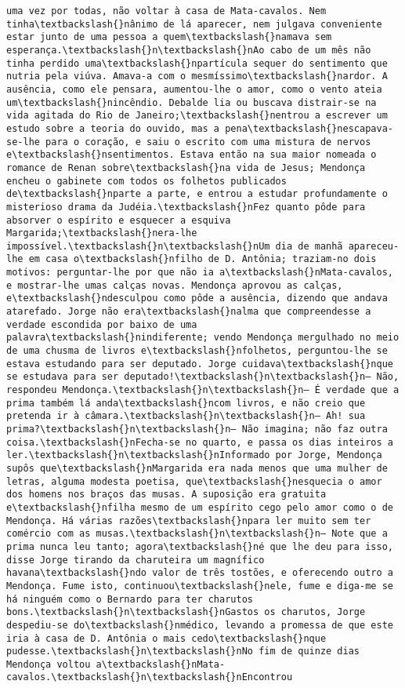 \begin{Verbatim}[commandchars=\\\{\}]
uma vez por todas, não voltar à casa de Mata-cavalos. Nem tinha\textbackslash{}nânimo de lá aparecer, nem julgava conveniente estar junto de uma pessoa a quem\textbackslash{}namava sem esperança.\textbackslash{}n\textbackslash{}nAo cabo de um mês não tinha perdido uma\textbackslash{}npartícula sequer do sentimento que nutria pela viúva. Amava-a com o mesmíssimo\textbackslash{}nardor. A ausência, como ele pensara, aumentou-lhe o amor, como o vento ateia um\textbackslash{}nincêndio. Debalde lia ou buscava distrair-se na vida agitada do Rio de Janeiro;\textbackslash{}nentrou a escrever um estudo sobre a teoria do ouvido, mas a pena\textbackslash{}nescapava-se-lhe para o coração, e saiu o escrito com uma mistura de nervos e\textbackslash{}nsentimentos. Estava então na sua maior nomeada o romance de Renan sobre\textbackslash{}na vida de Jesus; Mendonça encheu o gabinete com todos os folhetos publicados de\textbackslash{}nparte a parte, e entrou a estudar profundamente o misterioso drama da Judéia.\textbackslash{}nFez quanto pôde para absorver o espírito e esquecer a esquiva Margarida;\textbackslash{}nera-lhe impossível.\textbackslash{}n\textbackslash{}nUm dia de manhã apareceu-lhe em casa o\textbackslash{}nfilho de D. Antônia; traziam-no dois motivos: perguntar-lhe por que não ia a\textbackslash{}nMata-cavalos, e mostrar-lhe umas calças novas. Mendonça aprovou as calças, e\textbackslash{}ndesculpou como pôde a ausência, dizendo que andava atarefado. Jorge não era\textbackslash{}nalma que compreendesse a verdade escondida por baixo de uma palavra\textbackslash{}nindiferente; vendo Mendonça mergulhado no meio de uma chusma de livros e\textbackslash{}nfolhetos, perguntou-lhe se estava estudando para ser deputado. Jorge cuidava\textbackslash{}nque se estudava para ser deputado!\textbackslash{}n\textbackslash{}n— Não, respondeu Mendonça.\textbackslash{}n\textbackslash{}n— É verdade que a prima também lá anda\textbackslash{}ncom livros, e não creio que pretenda ir à câmara.\textbackslash{}n\textbackslash{}n— Ah! sua prima?\textbackslash{}n\textbackslash{}n— Não imagina; não faz outra coisa.\textbackslash{}nFecha-se no quarto, e passa os dias inteiros a ler.\textbackslash{}n\textbackslash{}nInformado por Jorge, Mendonça supôs que\textbackslash{}nMargarida era nada menos que uma mulher de letras, alguma modesta poetisa, que\textbackslash{}nesquecia o amor dos homens nos braços das musas. A suposição era gratuita e\textbackslash{}nfilha mesmo de um espírito cego pelo amor como o de Mendonça. Há várias razões\textbackslash{}npara ler muito sem ter comércio com as musas.\textbackslash{}n\textbackslash{}n— Note que a prima nunca leu tanto; agora\textbackslash{}né que lhe deu para isso, disse Jorge tirando da charuteira um magnífico havana\textbackslash{}ndo valor de três tostões, e oferecendo outro a Mendonça. Fume isto, continuou\textbackslash{}nele, fume e diga-me se há ninguém como o Bernardo para ter charutos bons.\textbackslash{}n\textbackslash{}nGastos os charutos, Jorge despediu-se do\textbackslash{}nmédico, levando a promessa de que este iria à casa de D. Antônia o mais cedo\textbackslash{}nque pudesse.\textbackslash{}n\textbackslash{}nNo fim de quinze dias Mendonça voltou a\textbackslash{}nMata-cavalos.\textbackslash{}n\textbackslash{}nEncontrou 
\end{Verbatim}
